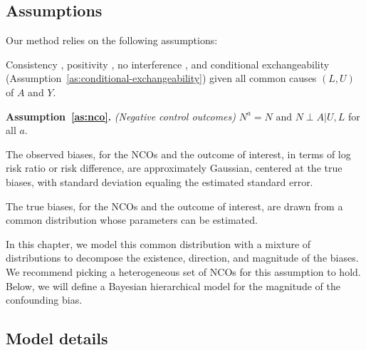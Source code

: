 \subsection{Assumptions}

Our method relies on the following assumptions:

\begin{assumption}
    Consistency \cite{naimi2023defining}, positivity \cite{naimi2023defining}, no interference \cite{naimi2023defining}, and conditional exchangeability (Assumption~\ref{as:conditional-exchangeability}) given all common causes $(L, U)$ of $A$ and $Y$.
\end{assumption}

\noindent \textbf{Assumption~\ref{as:nco}.} \textit{(Negative control outcomes)} $N^a = N \text{ and } N \perp A | U, L$ for all $a$.

\begin{assumption}
    The observed biases, for the NCOs and the outcome of interest, in terms of log risk ratio or risk difference, are approximately Gaussian, centered at the true biases, with standard deviation equaling the estimated standard error.
\end{assumption}

\begin{assumption}
    The true biases, for the NCOs and the outcome of interest, are drawn from a common distribution whose parameters can be estimated.
\end{assumption}

In this chapter, we model this common distribution with a mixture of distributions to decompose the existence, direction, and magnitude of the biases. We recommend picking a heterogeneous set of NCOs for this assumption to hold. Below, we will define a Bayesian hierarchical model for the magnitude of the confounding bias.

\subsection{Model details}





